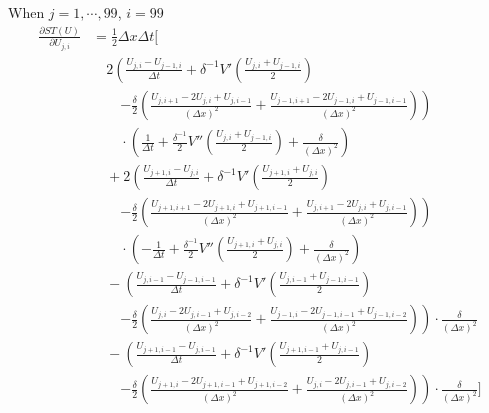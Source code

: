 \documentclass{article}
\begin{document}
When $j = 1,\cdots,99$, $i = 99$
\begin{align*}
  \frac{\partial ST(U)}{\partial U_{j,i}} 
  &= \frac{1}{2} \Delta x \Delta t \Bigg[ \\
  &\quad 2 \left( 
  \frac{U_{j,i} - U_{j-1,i}}{\Delta t} 
  + \delta^{-1} V'\left( \frac{U_{j,i} + U_{j-1,i}}{2} \right) \right. \\
  &\qquad \left. 
  - \frac{\delta}{2} \left( \frac{U_{j,i+1} - 2U_{j,i} + U_{j,i-1}}{(\Delta x)^2} 
  + \frac{U_{j-1,i+1} - 2U_{j-1,i} + U_{j-1,i-1}}{(\Delta x)^2} \right) 
  \right) \\
  &\qquad \cdot \left( 
  \frac{1}{\Delta t} + \frac{\delta^{-1}}{2} V''\left( \frac{U_{j,i} + U_{j-1,i}}{2} \right) + \frac{\delta}{(\Delta x)^2} 
  \right) \\
  &\quad + 2 \left( 
  \frac{U_{j+1,i} - U_{j,i}}{\Delta t} 
  + \delta^{-1} V'\left( \frac{U_{j+1,i} + U_{j,i}}{2} \right) \right. \\
  &\qquad \left. 
  - \frac{\delta}{2} \left( \frac{U_{j+1,i+1} - 2U_{j+1,i} + U_{j+1,i-1}}{(\Delta x)^2} 
  + \frac{U_{j,i+1} - 2U_{j,i} + U_{j,i-1}}{(\Delta x)^2} \right) 
  \right) \\
  &\qquad \cdot \left( 
  - \frac{1}{\Delta t} + \frac{\delta^{-1}}{2} V''\left( \frac{U_{j+1,i} + U_{j,i}}{2} \right) + \frac{\delta}{(\Delta x)^2} 
  \right) \\
  &\quad - \left( 
  \frac{U_{j,i-1} - U_{j-1,i-1}}{\Delta t} 
  + \delta^{-1} V'\left( \frac{U_{j,i-1} + U_{j-1,i-1}}{2} \right) \right. \\
  &\qquad \left. 
  - \frac{\delta}{2} \left( \frac{U_{j,i} - 2U_{j,i-1} + U_{j,i-2}}{(\Delta x)^2} 
  + \frac{U_{j-1,i} - 2U_{j-1,i-1} + U_{j-1,i-2}}{(\Delta x)^2} \right) 
  \right) \cdot \frac{\delta}{(\Delta x)^2} \\
  &\quad - \left( 
  \frac{U_{j+1,i-1} - U_{j,i-1}}{\Delta t} 
  + \delta^{-1} V'\left( \frac{U_{j+1,i-1} + U_{j,i-1}}{2} \right) \right. \\
  &\qquad \left. 
  - \frac{\delta}{2} \left( \frac{U_{j+1,i} - 2U_{j+1,i-1} + U_{j+1,i-2}}{(\Delta x)^2} 
  + \frac{U_{j,i} - 2U_{j,i-1} + U_{j,i-2}}{(\Delta x)^2} \right) 
  \right) \cdot \frac{\delta}{(\Delta x)^2} \Bigg]
\end{align*}
  
\end{document}
